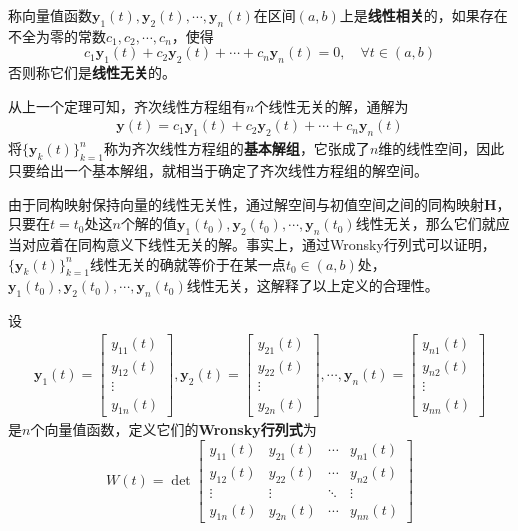 \begin{definition}[向量值函数的线性相关性]
    称向量值函数$\mathbf{y}_1(t),\mathbf{y}_2(t),\cdots,\mathbf{y}_n(t)$在区间$(a,b)$上是\textbf{线性相关}的，如果存在不全为零的常数$c_1,c_2,\cdots,c_n$，使得
    \[c_1\mathbf{y}_1(t)+c_2\mathbf{y}_2(t)+\cdots+c_n\mathbf{y}_n(t)=0,\quad \forall t\in(a,b)\]
    否则称它们是\textbf{线性无关}的。
\end{definition}

从上一个定理可知，齐次线性方程组有$n$个线性无关的解，通解为\begin{align*}
    \mathbf{y}(t)=c_1\mathbf{y}_1(t)+c_2\mathbf{y}_2(t)+\cdots+c_n\mathbf{y}_n(t)
\end{align*}
将$\{\mathbf{y}_k(t)\}_{k=1}^n$称为齐次线性方程组的\textbf{基本解组}，它张成了$n$维的线性空间，因此只要给出一个基本解组，就相当于确定了齐次线性方程组的解空间。

由于同构映射保持向量的线性无关性，通过解空间与初值空间之间的同构映射$\mathbf{H}$，只要在$t=t_0$处这$n$个解的值$\mathbf{y}_1(t_0),\mathbf{y}_2(t_0),\cdots,\mathbf{y}_n(t_0)$线性无关，那么它们就应当对应着在同构意义下线性无关的解。事实上，通过Wronsky行列式可以证明，$\{\mathbf{y}_k(t)\}_{k=1}^n$线性无关的确就等价于在某一点$t_0\in(a,b)$处，$\mathbf{y}_1(t_0),\mathbf{y}_2(t_0),\cdots,\mathbf{y}_n(t_0)$线性无关，这解释了以上定义的合理性。

\begin{definition}[Wronsky行列式]
    设\begin{align*}
    \mathbf{y}_1(t)=\begin{bmatrix}
    y_{11}(t)\\
    y_{12}(t)\\
    \vdots\\
    y_{1n}(t)
    \end{bmatrix},\mathbf{y}_2(t)=\begin{bmatrix}
    y_{21}(t)\\
    y_{22}(t)\\
    \vdots\\
    y_{2n}(t)
    \end{bmatrix},\cdots,\mathbf{y}_n(t)=\begin{bmatrix}
    y_{n1}(t)\\
    y_{n2}(t)\\
    \vdots\\
    y_{nn}(t)
    \end{bmatrix}
    \end{align*}
    是$n$个向量值函数，定义它们的\textbf{Wronsky行列式}为
    \[W(t)=\det\begin{bmatrix}
    y_{11}(t) & y_{21}(t) & \cdots & y_{n1}(t)\\
    y_{12}(t) & y_{22}(t) & \cdots & y_{n2}(t)\\
    \vdots & \vdots & \ddots & \vdots\\
    y_{1n}(t) & y_{2n}(t) & \cdots & y_{nn}(t)
    \end{bmatrix}\]
\end{definition}

